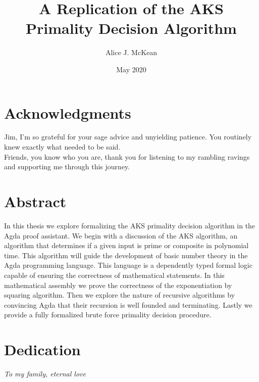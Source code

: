 \documentclass[12pt,twoside]{reedthesis}
\title{A Replication of the AKS Primality Decision Algorithm}
\author{Alice J. McKean}
\date{May 2020}
\newcommand{\Agda}[0]{Agda}
\begin{document}
\maketitle
\frontmatter
\pagestyle{empty}

\chapter*{Acknowledgments}
Jim, I'm so grateful for your sage advice and unyielding patience. You routinely
knew exactly what needed to be said. \\

Friends, you know who you are, thank you for listening to my rambling ravings
and supporting me through this journey.

\chapter*{Abstract}
In this thesis we explore formalizing the AKS primality decision algorithm in
the \Agda{} proof assistant. We begin with a discussion of the AKS algorithm, an
algorithm that determines if a given input is prime or composite in polynomial time.
This algorithm will guide the development of basic number theory in the \Agda{} programming
language. This language is a dependently typed formal logic capable of ensuring
the correctness of mathematical statements. In this mathematical assembly we
prove the correctness of the exponentiation by squaring algorithm. Then we
explore the nature of recursive algorithms by convincing \Agda{} that their
recursion is well founded and terminating. Lastly we provide a fully
formalized brute force primality decision procedure.

\chapter*{Dedication}
\textit{To my family, eternal love}

\tableofcontents

\mainmatter
\pagestyle{fancyplain}









\appendix

\backmatter

\nocite{gnu-parallel}


\end{document}
